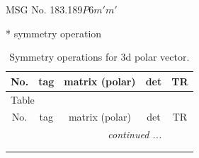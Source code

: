 \documentclass[fleqn,8pt]{jsarticle}
\begin{document}
\setcounter{MaxMatrixCols}{32}

\renewcommand{\tablename}{Table~}
\renewcommand{\figurename}{Figure~}
\begin{center}
\LARGE
MSG No. 183.189\quad$P6m'm'$
\end{center}
* symmetry operation
\renewcommand{\arraystretch}{1.3}
\begin{longtable}{ccccc}
\caption{Symmetry operations for 3d polar vector.}
 \\
 \hline \hline
No. & tag & matrix (polar) & det & TR \\ \hline \endfirsthead

\multicolumn{4}{l}{\tablename\ \thetable{}} \\
 \hline \hline
No. & tag & matrix (polar) & det & TR \\ \hline \endhead

 \hline \hline
\multicolumn{4}{r}{\footnotesize\it continued ...} \\ \endfoot

 \hline \hline
\multicolumn{4}{r}{} \\ \endlastfoot


\end{longtable}
\end{document}
